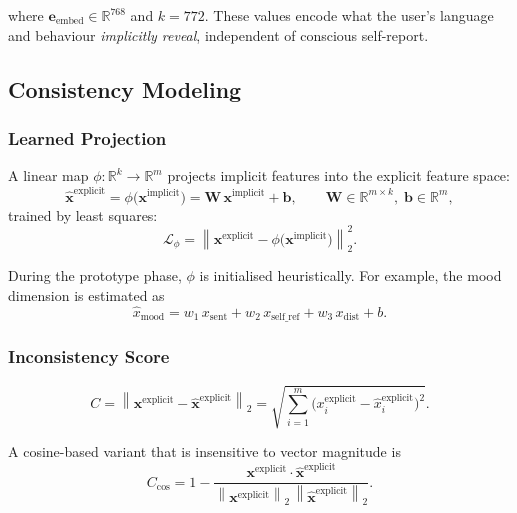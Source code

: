 \documentclass[12pt]{article}
\begin{document}
\noindent where $\mathbf{e}_{\text{embed}} \in \mathbb{R}^{768}$ and
$k = 772$. These values encode what the user's language and behaviour
\emph{implicitly reveal}, independent of conscious self-report.

\subsection{Consistency Modeling}
\label{sec:consistency}

\subsubsection{Learned Projection}

A linear map $\phi:\mathbb{R}^{k}\rightarrow\mathbb{R}^{m}$ projects
implicit features into the explicit feature space:
\begin{equation}
\hat{\mathbf{x}}^{\text{explicit}}
= \phi\bigl(\mathbf{x}^{\text{implicit}}\bigr)
= \mathbf{W}\,\mathbf{x}^{\text{implicit}} + \mathbf{b},
\qquad \mathbf{W}\in\mathbb{R}^{m\times k},\; \mathbf{b}\in\mathbb{R}^{m},
\end{equation}
trained by least squares:
\begin{equation}
\mathcal{L}_{\phi}
= \left\| \mathbf{x}^{\text{explicit}}
        - \phi\bigl(\mathbf{x}^{\text{implicit}}\bigr) \right\|_{2}^{2}.
\end{equation}

During the prototype phase, $\phi$ is initialised heuristically. For
example, the mood dimension is estimated as
\begin{equation}
\hat{x}_{\text{mood}}
= w_{1}\,x_{\text{sent}} + w_{2}\,x_{\text{self\_ref}}
+ w_{3}\,x_{\text{dist}} + b .
\end{equation}

\subsubsection{Inconsistency Score}

\begin{equation}
C = \left\| \mathbf{x}^{\text{explicit}}
        - \hat{\mathbf{x}}^{\text{explicit}} \right\|_{2}
= \sqrt{\sum_{i=1}^{m}\bigl(x_i^{\text{explicit}}
        - \hat{x}_i^{\text{explicit}}\bigr)^{2}} .
\end{equation}

\noindent A cosine-based variant that is insensitive to vector magnitude is
\begin{equation}
C_{\cos} = 1
- \frac{\mathbf{x}^{\text{explicit}} \cdot \hat{\mathbf{x}}^{\text{explicit}}}
       {\left\|\mathbf{x}^{\text{explicit}}\right\|_{2}\,
        \left\|\hat{\mathbf{x}}^{\text{explicit}}\right\|_{2}} .
\end{equation}
\end{document}
